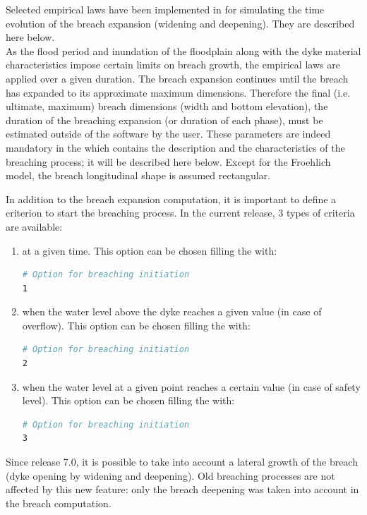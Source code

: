 Selected empirical laws have been implemented in  for simulating the time
evolution of the breach expansion (widening and deepening). They are described here below. \\
As the flood period and inundation of the floodplain along with the dyke material
characteristics impose certain limits on breach growth, the empirical laws are applied over
a given duration. The breach expansion continues until the breach has expanded to its
approximate maximum dimensions. Therefore the final (i.e. ultimate, maximum) breach
dimensions (width and bottom elevation), the duration of the breaching expansion
(or duration of each phase), must be estimated outside
of the \tel software by the user. These parameters are indeed mandatory in the
 which contains the description and the characteristics of
the breaching process; it will be described here below.
Except for the Froehlich model, the breach longitudinal shape is assumed rectangular.

In addition to the breach expansion computation, it is important to define a criterion to start
the breaching process. In the current release, 3 types of criteria are available:

\begin{enumerate}
\item at a given time. This option can be chosen filling the  with:
\begin{lstlisting}[language=bash]
# Option for breaching initiation
1
\end{lstlisting}

\item when the water level above the dyke reaches a given value
(in case of overflow). This option can be chosen filling the  with:
\begin{lstlisting}[language=bash]
# Option for breaching initiation
2
\end{lstlisting}

\item when the water level at a given point reaches a certain value
(in case of safety level). This option can be chosen filling the  with:
\begin{lstlisting}[language=bash]
# Option for breaching initiation
3
\end{lstlisting}
\end{enumerate}

Since release 7.0, it is possible to take into account a lateral growth
of the breach (dyke opening by widening and deepening).
Old breaching processes are not affected by this new feature: only the breach
deepening was taken into account in the breach computation.


